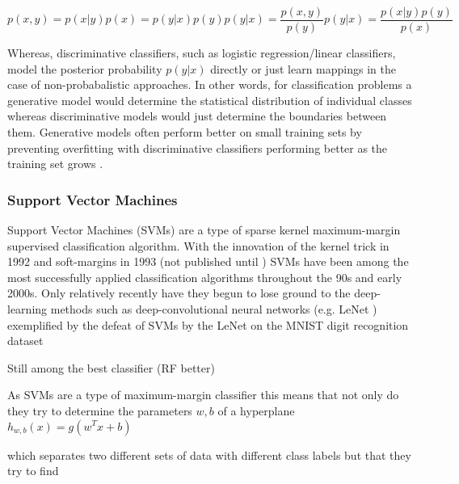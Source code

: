 \[
    p(x,y) = p(x|y)p(x) = p(y|x)p(y)
    p(y|x) = \frac{p(x,y)}{p(y)}
    p(y|x) = \frac{p(x|y)p(y)}{p(x)}
    \label{eq:bayes}
\]

Whereas, discriminative classifiers, such as logistic regression/linear classifiers,
model the posterior probability \(p(y|x)\) directly or just learn mappings in the case of non-probabalistic approaches.
In other words, for classification problems a generative model would determine the statistical distribution of 
individual classes whereas discriminative models would just determine the boundaries between them.
Generative models often perform better on small training sets by preventing overfitting with discriminative
classifiers performing better as the training set grows \citep{Ng2002}.



\subsubsection{Support Vector Machines}

Support Vector Machines (SVMs) are a type of sparse kernel maximum-margin supervised classification algorithm.
With the innovation of the kernel trick in 1992 \citep{Boser1992} and soft-margins in 1993 (not published until \citep{Cortes1995}) SVMs have been 
among the most successfully applied classification algorithms throughout the 90s and early 2000s.
Only relatively recently have they begun to lose ground to the deep-learning methods such as deep-convolutional neural networks (e.g. LeNet \citep{LeCunn1998}) exemplified 
by the defeat of SVMs by the LeNet on the MNIST digit recognition dataset \citep{Hinton2006,Bengio2007} \citep{Bengio2013}



Still among the best classifier (RF better) \citep{Fernandez-Delgado2014}

As SVMs are a type of maximum-margin classifier this means that not only do they try to determine the parameters \(w,b\) of a hyperplane \(h_{w,b}(x) = g(w^{T}x+b)\) 


which separates two different sets of data with different class labels but that they try to find

